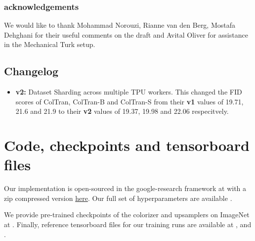 \documentclass{article} \usepackage{iclr2021_conference,times}
\begin{document}
\newpage
\appendix

\subsubsection*{acknowledgements}
We would like to thank Mohammad Norouzi, Rianne van den Berg, Mostafa Dehghani for their useful comments on the draft and Avital Oliver for assistance in the Mechanical Turk setup.

\subsection*{Changelog}
\begin{itemize}
    \item \textbf{v2:} Dataset Sharding \href{https://github.com/google-research/google-research/commit/9b55abc4c5ce56e05eabf97b38e54ed4f02f1f5c#diff-97a2eb4ed45d676bd37895ab6f334e7bd9f7dd293b30264bbfbb052079f617c4}{\color{blue}{fix}} across multiple TPU workers. This changed the FID scores of ColTran, ColTran-B and ColTran-S from their \textbf{v1} values of 19.71, 21.6 and 21.9 to their \textbf{v2} values of 19.37, 19.98 and 22.06 respecitvely.
\end{itemize}


\section{Code, checkpoints and tensorboard files}

Our implementation is open-sourced in the google-research framework at \href{https://github.com/google-research/google-research/tree/master/coltran}{\color{blue}{https://github.com/google-research/google-research/tree/master/coltran}} with a zip compressed version \href{https://storage.cloud.google.com/gresearch/coltran/coltran.zip}{\color{blue}here}. Our full set of hyperparameters are available \href{https://github.com/google-research/google-research/tree/master/coltran/configs}{\color{blue}{here}}.


We provide pre-trained checkpoints of the colorizer and upsamplers on ImageNet at \href{https://console.cloud.google.com/storage/browser/gresearch/coltran}{\color{blue}{https://console.cloud.google.com/storage/browser/gresearch/coltran}}. 
Finally, reference tensorboard files for our training runs are available at \href{https://tensorboard.dev/experiment/jrf7Og9oTeGEL2KrArQu6Q/#scalars&_smoothingWeight=0}{\color{blue}{colorizer tensorboard}}, \href{https://tensorboard.dev/experiment/H1djRZFXSbmmRMx5eG7hoA/#scalars&_smoothingWeight=0}{\color{blue}{color upsampler tensorboard}} and \href{https://tensorboard.dev/experiment/eZAzlXyESA2lmjmR5hDWNQ/#scalars&_smoothingWeight=0}{\color{blue}{spatial upsampler tensorboard}}.
\end{document}
